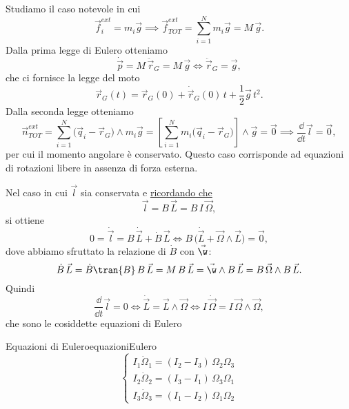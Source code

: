 \begin{ese}
	Studiamo il caso notevole in cui
	\[
		\vec{f}_i^{ext} = m_i \vec{g} \implies \vec{f}_{TOT}^{ext} = \sum_{i=1}^N m_i \vec{g} = M\,\vec{g}.
	\]
	Dalla prima legge di Eulero otteniamo
	\[
		\dot{\vec{p}} = M\,\ddot{\vec{r}}_G = M\,\vec{g} \iff \ddot{\vec{r}}_G = \vec{g},
	\]
	che ci fornisce la legge del moto
	\[
		\vec{r}_G(t) = \vec{r}_G(0) + \dot{\vec{r}}_G(0)\,t + \frac{1}{2}\vec{g}\,t^2.
	\]
	Dalla seconda legge otteniamo
	\[
		\vec{n}_{TOT}^{ext} = \sum_{i=1}^N\big(\vec{q}_i-\vec{r}_G\big)\wedge m_i \vec{g} = \left[\sum_{i=1}^N m_i\big(\vec{q}_i-\vec{r}_G\big)\right] \wedge \vec{g} = \vec{0} \implies \frac{\dd}{\dd t}\vec{l} = \vec{0},
	\]
	per cui il momento angolare è conservato.
	Questo caso corrisponde ad equazioni di rotazioni libere in assenza di forza esterna.
\end{ese}
\noindent
Nel caso in cui \(\vec{l}\) sia conservata e \hyperref[mk:momentoAngolareTotaleCorpoRigido]{ricordando che}
\[
	\vec{l} = B\,\vec{L} = B\,I\,\vec{\Omega},
\]
si ottiene
\[
	0 = \dot{\vec{l}} = B\,\dot{\vec{L}} + \dot{B}\,\vec{L} \iff B\,\big(\dot{\vec{L}} + \vec{\Omega} \wedge \vec{L}\big) = \vec{0},
\]
dove abbiamo sfruttato la relazione di \(\dot{B}\) con \(\vec{\w}\):
\[
	\dot{B}\,\vec{L} = \dot{B}\tran{B}\,B\,\vec{L} = M\,B\,\vec{L} = \vec{\w} \wedge B\,\vec{L} = B\,\vec{\Omega} \wedge B\,\vec{L}.
\]
Quindi
\[
	\frac{\dd}{\dd t}\vec{l} = 0 \iff \dot{\vec{L}} = \vec{L} \wedge \vec{\Omega} \iff I\,\dot{\vec{\Omega}} = I\,\vec{\Omega} \wedge \vec{\Omega},
\]
che sono le cosiddette equazioni di Eulero

\begin{remark}{Equazioni di Eulero}{equazioniEulero}
	\[
		\begin{cases}
			I_1 \dot{\Omega}_1 = (I_2-I_3)\,\Omega_2 \Omega_3 \\
			I_2 \dot{\Omega}_2 = (I_3-I_1)\,\Omega_3 \Omega_1 \\
			I_3 \dot{\Omega}_3 = (I_1-I_2)\,\Omega_1 \Omega_2
		\end{cases}
	\]
\end{remark}

